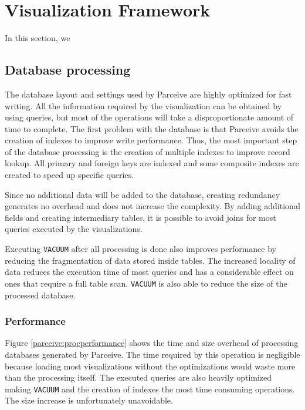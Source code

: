 \section{Visualization Framework}

In this section, we 

\subsection{Database processing}
\label{dataprocessing}

The database layout and settings used by Parceive are highly optimized for fast
writing. All the information required by the visualization can be obtained by
using queries, but most of the operations will take a disproportionate amount
of time to complete. The first problem with the database is that Parceive
avoids the creation of indexes to improve write performance. Thus, the most
important step of the database processing is the creation of multiple indexes
to improve record lookup. All primary and foreign keys are indexed and some
composite indexes are created to speed up specific queries.

Since no additional data will be added to the database, creating redundancy
generates no overhead and does not increase the complexity. By adding
additional fields and creating intermediary tables, it is possible to avoid
joins for most queries executed by the visualizations. 

Executing \texttt{VACUUM} after all processing is done also improves
performance by reducing the fragmentation of data stored inside tables. The
increased locality of data reduces the execution time of most queries and has a
considerable effect on ones that require a full table scan. \texttt{VACUUM} is
also able to reduce the size of the processed
database.

\subsubsection*{Performance}

Figure \ref{parceive:procperformance} shows the time and size overhead of
processing databases generated by Parceive. The time required by this operation
is negligible because loading most visualizations without the optimizations
would waste more than the processing itself. The executed queries are also
heavily optimized making \texttt{VACUUM} and the creation of indexes the most
time consuming operations. The size increase is unfortunately unavoidable.

